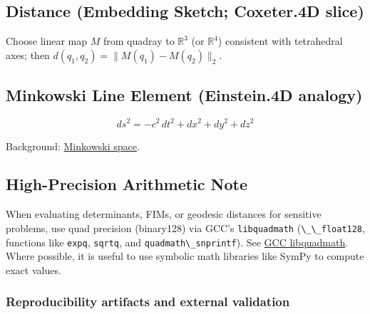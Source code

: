 \documentclass[
  10pt,
]{article}
\newcommand{\passthrough}[1]{#1}
\begin{document}
\hypertarget{distance-embedding-sketch-coxeter.4d-slice}{%
\subsection{Distance (Embedding Sketch; Coxeter.4D
slice)}\label{distance-embedding-sketch-coxeter.4d-slice}}

Choose linear map \(M\) from quadray to \(\mathbb{R}^3\) (or
\(\mathbb{R}^4\)) consistent with tetrahedral axes; then
\(d(q_1,q_2) = \lVert M(q_1) - M(q_2) \rVert_2\).

\hypertarget{minkowski-line-element-einstein.4d-analogy}{%
\subsection{Minkowski Line Element (Einstein.4D
analogy)}\label{minkowski-line-element-einstein.4d-analogy}}

\begin{equation}\label{eq:supp_minkowski}
ds^2 = -c^2\,dt^2 + dx^2 + dy^2 + dz^2
\end{equation}

Background:
\href{https://en.wikipedia.org/wiki/Minkowski_space}{Minkowski space}.

\hypertarget{high-precision-arithmetic-note}{%
\subsection{High-Precision Arithmetic
Note}\label{high-precision-arithmetic-note}}

When evaluating determinants, FIMs, or geodesic distances for sensitive
problems, use quad precision (binary128) via GCC's
\passthrough{\lstinline!libquadmath!}
(\passthrough{\lstinline!\_\_float128!}, functions like
\passthrough{\lstinline!expq!}, \passthrough{\lstinline!sqrtq!}, and
\passthrough{\lstinline!quadmath\_snprintf!}). See
\href{https://gcc.gnu.org/onlinedocs/libquadmath/index.html}{GCC
libquadmath}. Where possible, it is useful to use symbolic math
libraries like SymPy to compute exact values.

\hypertarget{reproducibility-artifacts-and-external-validation}{%
\subsubsection{Reproducibility artifacts and external
validation}\label{reproducibility-artifacts-and-external-validation}}
\end{document}
